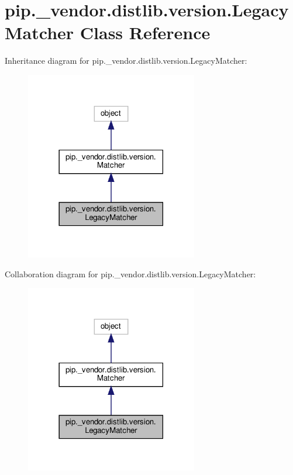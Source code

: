 \hypertarget{classpip_1_1__vendor_1_1distlib_1_1version_1_1LegacyMatcher}{}\section{pip.\+\_\+vendor.\+distlib.\+version.\+Legacy\+Matcher Class Reference}
\label{classpip_1_1__vendor_1_1distlib_1_1version_1_1LegacyMatcher}


Inheritance diagram for pip.\+\_\+vendor.\+distlib.\+version.\+Legacy\+Matcher\+:
\nopagebreak
\begin{figure}[H]
\begin{center}
\leavevmode
\includegraphics[width=213pt]{classpip_1_1__vendor_1_1distlib_1_1version_1_1LegacyMatcher__inherit__graph}
\end{center}
\end{figure}


Collaboration diagram for pip.\+\_\+vendor.\+distlib.\+version.\+Legacy\+Matcher\+:
\nopagebreak
\begin{figure}[H]
\begin{center}
\leavevmode
\includegraphics[width=213pt]{classpip_1_1__vendor_1_1distlib_1_1version_1_1LegacyMatcher__coll__graph}
\end{center}
\end{figure}
